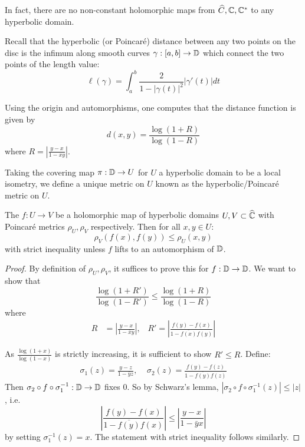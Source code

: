 \documentclass[10pt,a4paper]{article}
\begin{document}
In fact, there are no non-constant holomorphic maps from $\widehat{C}, \mathbb{C}, \mathbb{C}^\ast$ to any hyperbolic domain.

Recall that the hyperbolic (or Poincar\'e) distance between any two points on the disc is the infimum along smooth curves $\gamma : [a,b] \to \mathbb{D}$ which connect the two points of the length value:\[ \ell(\gamma) = \int_a^b \frac{2}{1-|\gamma(t)|^2}|\gamma'(t)| dt\]

Using the origin and automorphisms, one computes that the distance function is given by \[d(x,y) = \frac{\log(1+R)}{\log(1-R)}\] where $R = \left|\frac{y-x}{1-xy}\right|$.

\begin{definition}
  Taking the covering map $\pi:\mathbb{D}\to U$ for $U$ a hyperbolic domain to be a local isometry, we define a unique metric on $U$ known as the hyperbolic/Poincar\'e metric on $U$.
\end{definition}

\begin{theorem}
  The $f:U\to V$ be a holomorphic map of hyperbolic domains $U, V \subset \widehat{\mathbb{C}}$ with Poincar\'e metrics $\rho_U, \rho_V$ respectively. Then for all $x, y \in U$:\[ \rho_V(f(x), f(y)) \leq \rho_U(x,y)\] with strict inequality unless $f$ lifts to an automorphism of $\mathbb{D}$.
\end{theorem}
\begin{proof}
  By definition of $\rho_U, \rho_V$, it suffices to prove this for $f: \mathbb{D} \to \mathbb{D}$. We want to show that \[\frac{\log(1+R')}{\log(1-R')} \leq \frac{\log(1+R)}{\log(1-R)}\] where
  \begin{align*}
    R &= \left|\frac{y-x}{1-\bar{x}y}\right|,\;\;\;  R' = \left|\frac{f(y)-f(x)}{1-\overline{f(x)}f(y)}\right|
  \end{align*}

  As $\frac{\log(1+x)}{\log(1-x)}$ is strictly increasing, it is sufficient to show $R' \leq R$. Define:
  \begin{align*}
    \sigma_1(z) = \frac{y-z}{1-\bar{y}z},\;\;\;\;\sigma_2(z) = \frac{f(y)-f(z)}{1-\overline{f(y)}f(z)}
  \end{align*}
  Then $\sigma_2 \circ f \circ \sigma_1^{-1} : \mathbb{D} \to \mathbb{D}$ fixes 0. So by Schwarz's lemma, $|\sigma_2 \circ f \circ \sigma_1^{-1}(z)| \leq |z|$, i.e.
  \[
    \left|\frac{f(y)-f(x)}{1-\overline{f(y)}f(x)}\right| \leq \left|\frac{y-x}{1-\bar{y}x}\right|
  \]
by setting $\sigma_1^{-1}(z) = x$. The statement with strict inequality follows similarly.
\end{proof}
\end{document}
